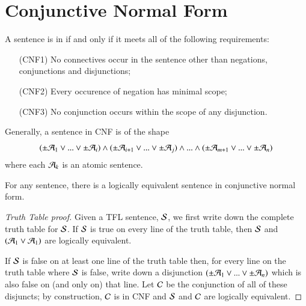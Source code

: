 \documentclass[12pt, a4paper, oneside, openright, titlepage]{book}
\begin{document}
\section{\textsection Conjunctive Normal Form}

\begin{defn}
    A sentence is in  if and only if it meets all of the following requirements: \begin{itemize}[leftmargin=+1in]
        \item[(CNF1)] No connectives occur in the sentence other than negations, conjunctions and disjunctions;
        \item[(CNF2)] Every occurence of negation has minimal scope;
        \item[(CNF3)] No conjunction occurs within the scope of any disjunction.
    \end{itemize}
\end{defn}

\begin{rmk}
    Generally, a sentence in CNF is of the shape \begin{equation*}
        (\pm\mathcal{A}_1\vee ...\vee\pm\mathcal{A}_i)\wedge(\pm\mathcal{A}_{i+1}\vee ...\vee\pm\mathcal{A}_j)\wedge...\wedge(\pm\mathcal{A}_{m+1}\vee ...\vee\pm\mathcal{A}_n)
    \end{equation*}
    where each $\mathcal{A}_k$ is an atomic sentence.
\end{rmk}

\begin{namthm}
    For any sentence, there is a logically equivalent sentence in conjunctive normal form.
\end{namthm}
\begin{proof}[Truth Table proof]
    Given a TFL sentence, $\mathcal{S}$, we first write down the complete truth table for $\mathcal{S}$. If $\mathcal{S}$ is true on every line of the truth table, then $\mathcal{S}$ and $(\mathcal{A}_1\vee\mathcal{A}_1)$ are logically equivalent.

    If $\mathcal{S}$ is false on at least one line of the truth table then, for every line on the truth table where $\mathcal{S}$ is false, write down a disjunction $(\pm\mathcal{A}_1\vee...\vee\pm\mathcal{A}_n)$ which is also false on (and only on) that line. Let $\mathcal{C}$ be the conjunction of all of these disjuncts; by construction, $\mathcal{C}$ is in CNF and $\mathcal{S}$ and $\mathcal{C}$ are logically equivalent.
\end{proof}
\end{document}
